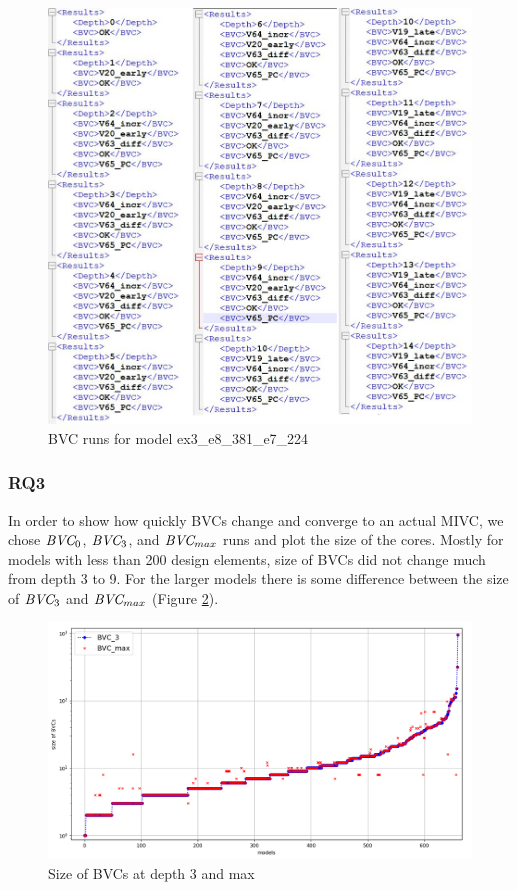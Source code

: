\begin{figure}
 \centering
  \includegraphics[width=\columnwidth]{figs/explout.png}
  \caption{BVC runs for model ex3\_e8\_381\_e7\_224}
  \vspace{0.1in}
  \label{fig:explout}
\end{figure}


\vspace{0.1in}
\subsubsection{RQ3}
In order to show how quickly BVCs change and converge to an actual MIVC, we chose $\textit{BVC} _{0}$, $\textit{BVC} _{3}$, and $\textit{BVC} _{max}$  runs and plot the size of the cores. Mostly for models with less than 200 design elements, size of BVCs did not change much from depth 3 to 9. For the larger models there is some difference between the size of $\textit{BVC} _{3}$ and $\textit{BVC} _{max}$ (Figure \ref{fig:bvc-growth}).


 \begin{figure}
 \centering
  \includegraphics[width=.85\columnwidth]{figs/bvcmax.png}
  \caption{Size of BVCs at depth 3 and max}
  \vspace{0.1in}
  \label{fig:bvc-growth}
\end{figure}


